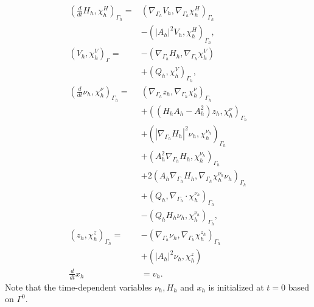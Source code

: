 \begin{subequations}
\label{eq:FEM}
 \begin{align}
\left( \frac{d}{dt}H_{h}, \chi_{h} ^{H} \right)_{\Gamma_{h} } =&  \left( \nabla _{\Gamma_{h} } V_{h}, \nabla _{\Gamma_{h} }\chi_{h} ^{H} \right) _{\Gamma_{h} } \nonumber \\
                                                   &- \left( \left\lvert A_{h} \right\rvert ^2 V_{h}, \chi_{h} ^{H} \right) _{\Gamma_{h} },   \\
\left( V_{h}, \chi_{h} ^{V} \right)_{\Gamma } =& -\left( \nabla _{\Gamma_{h} } H_{h}, \nabla _{\Gamma_{h} } \chi_{h} ^{V} \right) \nonumber \\
 & + \left( Q_{h}, \chi_{h} ^{V} \right)_{\Gamma_{h} },   \\
\left( \frac{d}{dt} \nu_{h} , \chi_{h} ^{\nu } \right)_{\Gamma_{h} } =& \left( \nabla _{\Gamma_{h} }z_{h}, \nabla _{\Gamma_{h} } \chi_{h} ^{\nu } \right) _{\Gamma_{h} }\nonumber   \\
 & + \left( ( H_{h}A_{h} - A_{h}^2  )z_{h},\chi_{h}^\nu  \right)_{\Gamma_{h} }   \nonumber \\
 & + \left( \left\lvert \nabla _{\Gamma_{h} } H_{h} \right\rvert^2 \nu_{h} , \chi_{h} ^{\nu_{h} }  \right)_{\Gamma_{h}} \nonumber  \\
 & + \left(  A_{h}^2\nabla _{\Gamma_{h} } H_{h}, \chi_{h} ^{\nu_{h} }  \right)_{\Gamma_{h}} \nonumber  \\
 & + 2 \left( A_{h} \nabla _{\Gamma_{h} } H_{h}, \nabla _{\Gamma_{h} } \chi_{h} ^{\nu_{h} } \nu_{h}  \right)_{\Gamma_{h}} \nonumber    \\
 &  + \left( Q_{h}, \nabla _{\Gamma_{h} } \cdot \chi_{h} ^{\nu_{h} }  \right)_{\Gamma_{h} } \nonumber  \\
  &- \left( Q_{h}H_{h}\nu_{h} , \chi_{h} ^{\nu_{h} } \right) _{\Gamma_{h}},\\
\left( z_{h}, \chi_{h} ^{z} \right) _{\Gamma_{h} }  =& - \left( \nabla _{\Gamma_{h} } \nu_{h} , \nabla _{\Gamma_{h} } \chi_{h} ^{z_{h}} \right)_{\Gamma_{h}} \nonumber \\
 & + \left( \left\lvert A_{h} \right\rvert ^2 \nu_{h} , \chi_{h} ^{z} \right) \\
\frac{d}{dt}x_h &= v_h
 .\end{align}
\end{subequations}
Note that the time-dependent variables $\nu_{h}, H_{h} $ and $x_{h}$ is initialized at $t=0$  based on $\Gamma ^{0}$.





